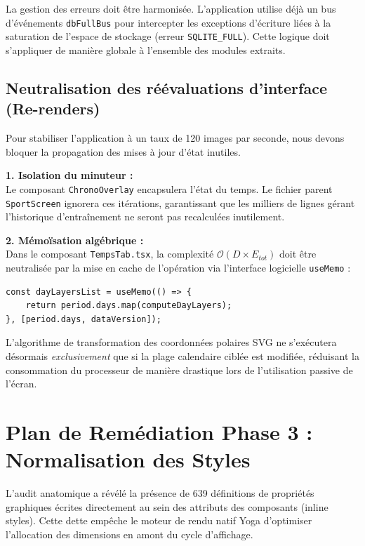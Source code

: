 \documentclass[11pt, a4paper]{article}
\begin{document}
La gestion des erreurs doit être harmonisée. L'application utilise déjà un bus d'événements \texttt{dbFullBus} pour intercepter les exceptions d'écriture liées à la saturation de l'espace de stockage (erreur \texttt{SQLITE\_FULL}). Cette logique doit s'appliquer de manière globale à l'ensemble des modules extraits.

\subsection{Neutralisation des réévaluations d'interface (Re-renders)}
Pour stabiliser l'application à un taux de 120 images par seconde, nous devons bloquer la propagation des mises à jour d'état inutiles.

\textbf{1. Isolation du minuteur :}\\
Le composant \texttt{ChronoOverlay} encapsulera l'état du temps. Le fichier parent \texttt{SportScreen} ignorera ces itérations, garantissant que les milliers de lignes gérant l'historique d'entraînement ne seront pas recalculées inutilement.

\textbf{2. Mémoïsation algébrique :}\\
Dans le composant \texttt{TempsTab.tsx}, la complexité $\mathcal{O}(D \times E_{tot})$ doit être neutralisée par la mise en cache de l'opération via l'interface logicielle \texttt{useMemo} :

\begin{verbatim}
const dayLayersList = useMemo(() => {
    return period.days.map(computeDayLayers);
}, [period.days, dataVersion]);
\end{verbatim}

L'algorithme de transformation des coordonnées polaires SVG ne s'exécutera désormais \textit{exclusivement} que si la plage calendaire ciblée est modifiée, réduisant la consommation du processeur de manière drastique lors de l'utilisation passive de l'écran.

\newpage

\section{Plan de Remédiation Phase 3 : Normalisation des Styles}

L'audit anatomique a révélé la présence de 639 définitions de propriétés graphiques écrites directement au sein des attributs des composants (inline styles). Cette dette empêche le moteur de rendu natif Yoga d'optimiser l'allocation des dimensions en amont du cycle d'affichage.
\end{document}
